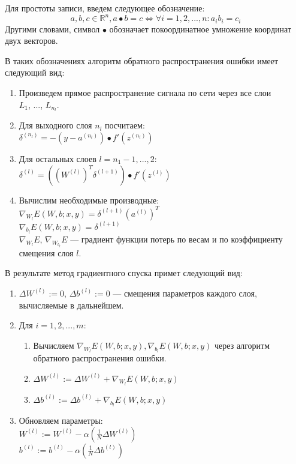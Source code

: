 \documentclass[14pt, a4paper]{extarticle}
\begin{document}
Для простоты записи, введем следующее обозначение:
\begin{equation*}
	a, b, c\in \mathbb{R}^n, a \bullet b = c \Leftrightarrow \forall i = 1, 2, ..., n: a_i b_i = c_i
\end{equation*}
Другими словами, символ $\bullet$ обозначает покоординатное умножение координат двух векторов.

В таких обозначениях алгоритм обратного распространения ошибки имеет следующий вид:
\begin{enumerate}
	\item Произведем прямое распространение сигнала по сети через все слои \\ $L_1$, ..., $L_{n_l}$.
	\item Для выходного слоя $n_l$ посчитаем: \\ $\delta^{(n_l)} = - (y - a^{(n_l)}) \bullet f'(z^{(n_l)})$
	\item Для остальных слоев $l = n_1-1, ..., 2$: \\ $\delta^{(l)} = ((W^{(l)})^T\delta^{(l+1)}) \bullet f'(z^{(l)})$
	\item Вычислим необходимые производные: \\ $\nabla_{W_{l}} E(W, b; x, y) = \delta^{(l+1)}(a^{(l)})^T$ \\ $\nabla_{b_{l}} E(W, b; x, y) = \delta^{(l+1)}$ \\ $\nabla_{W_{l}}E$, $\nabla_{W_{b_l}}E$ — градиент функции потерь по весам и по коэффициенту смещения слоя $l$.
\end{enumerate}

В результате метод градиентного спуска примет следующий вид:
\begin{enumerate}
	\item $\Delta W^{(l)} := 0$, $\Delta b^{(l)} := 0$ — смещения параметров каждого слоя, вычисляемые в дальнейшем.
	\item Для $i = 1, 2, ..., m$:
	\begin{enumerate}
	\item Вычисляем $\nabla_{W_{l}} E(W, b; x, y), \nabla_{b_{l}} E(W, b; x, y)$ через алгоритм обратного распространения ошибки.
	\item $\Delta W^{(l)} := \Delta W^{(l)} + \nabla_{W_{l}} E(W, b; x, y)$
	\item $\Delta b^{(l)} := \Delta b^{(l)}  + \nabla_{b_{l}} E(W, b; x, y)$
	\end{enumerate}
	\item Обновляем параметры: \\ $W^{(l)} := W^{(l)} - \alpha (\frac{1}{N} \Delta W^{(l)})$ \\ $b^{(l)} := b^{(l)} - \alpha (\frac{1}{N} \Delta b^{(l)})$
\end{enumerate}
\end{document}
